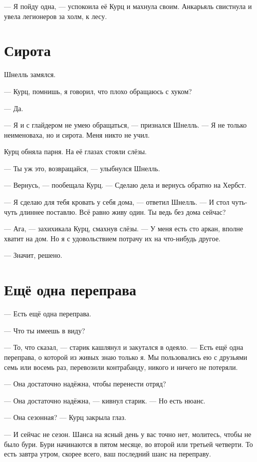 \documentclass[a4paper,10pt,fleqn]{book}\usepackage{polyglossia}\setdefaultlanguage{english}\setotherlanguage{russian}\defaultfontfeatures{Ligatures=TeX,Mapping=tex-text}\usepackage{xcolor}\definecolor{lightgray}{HTML}{bbbbbb}\color{lightgray}\newcommand{\ml}[3]{\textcolor{black}{#3}}
\begin{document}
--- Я пойду одна, --- успокоила её Курц и махнула своим.
Анкарьяль свистнула и увела легионеров за холм, к лесу.

\section{Сирота}

Шнелль замялся.

--- Курц, помнишь, я говорил, что плохо обращаюсь с хуком?

--- Да.

--- Я и с глайдером не умею обращаться, --- признался Шнелль.
--- Я не только неименоваха, но и сирота.
Меня никто не учил.

Курц обняла парня.
На её глазах стояли слёзы.

--- Ты уж это, возвращайся, --- улыбнулся Шнелль.

--- Вернусь, --- пообещала Курц.
--- Сделаю дела и вернусь обратно на Хербст.

--- Я сделаю для тебя кровать у себя дома, --- ответил Шнелль.
--- И стол чуть-чуть длиннее поставлю.
Всё равно живу один.
Ты ведь без дома сейчас?

--- Ага, --- захихикала Курц, смахнув слёзы.
--- У меня есть сто аркан, вполне хватит на дом.
Но я с удовольствием потрачу их на что-нибудь другое.

--- Значит, решено.

\section{Ещё одна переправа}

--- Есть ещё одна переправа.

--- Что ты имеешь в виду?

--- То, что сказал, --- старик кашлянул и закутался в одеяло.
--- Есть ещё одна переправа, о которой из живых знаю только я.
Мы пользовались ею с друзьями семь или восемь раз, перевозили контрабанду, никого и ничего не потеряли.

--- Она достаточно надёжна, чтобы перенести отряд?

--- Она достаточно надёжна, --- кивнул старик.
--- Но есть нюанс.

--- Она сезонная? --- Курц закрыла глаз.

--- И сейчас не сезон.
Шанса на ясный день у вас точно нет, молитесь, чтобы не было бури.
Бури начинаются в пятом месяце, во второй или третьей четверти.
То есть завтра утром, скорее всего, ваш последний шанс на переправу.
\end{document}
